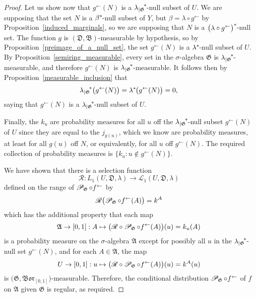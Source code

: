\documentclass[
twoside=true,
paper=letter,
fontsize=11pt,
pagesize=auto,
leqno,
openany,
headsepline,
overfullrule,
]{scrbook}
\theoremstyle{plain}
\theoremstyle{plain}
\theoremstyle{definition}
\theoremstyle{bfnoteitalic}
\theoremstyle{bfnoteroman}
\newcommand{\sigalg}[1]{\mathfrak{#1}}
\newcommand{\cali}[1]{\mathscr{#1}}
\newcommand{\condprobop}[1]{\mathop{\cali{P}\hspace{-1pt}}\nolimits_{#1}}
\newcommand{\borel}{\mathfrak{Bor}}
\newcommand{\textsigma}{\hbox{\large{$\sigma$}}\kern-1pt}
\newcommand{\restrictedto}[1]{_{\lvert#1}\kern-1.5pt}
\newcommand{\preimage}[1]{#1^{\leftarrow}}
\newcommand{\sigmaalgebra}{\sigalg{A}}
\newcommand{\sigmaalgebraii}{\sigalg{B}}
\newcommand{\kernast}{\ast\kern-1pt}
\newcommand{\funcf}{f}
\newcommand{\funcg}{g}
\newcommand{\funck}{k}
\newcommand{\funcj}{j}
\newcommand{\function}{f}
\newcommand{\measurespaceii}{Y}
\newcommand{\measlambda}{\lambda}
\newcommand{\seti}{A}
\newcommand{\regular}{\cali{R}}
\newcommand{\uspace}{U}%
\newcommand{\uspaceelt}{u}
\newcommand{\uspacesig}{\sigalg{D}}
\newcommand{\marginaltwo}{\beta}%
\begin{document}
\begin{proof}
Let us show now that  $\preimage{\funcg}(N)$ is a
${\measlambda\restrictedto{\sigalg{G}}}^\kernast$\hyp{}null subset of $\uspace$.
We are supposing that the set
$N$ is a
$\marginaltwo^\kernast$\hyp{}null subset of $\measurespaceii$,
but
$\marginaltwo = \measlambda \circ \preimage{\funcg}$ by Proposition~\ref{induced_marginals}, so
we are supposing that $N$ is a
$\bigl(\measlambda\circ\preimage{\funcg}\bigr)^\kernast$\hyp{}null set.
The function
$\funcg$ is $(\uspacesig,\sigmaalgebraii)$\hyp{}measurable by hypothesis,
so by Proposition~\ref{preimage_of_a_null_set}, the set
$\preimage{\funcg}(N)$ is a $\measlambda^\kernast$\hyp{}null subset of $\uspace$.
By Proposition~\ref{semiring_measurable}, every set in the \textsigma\hyp{}algebra $\sigalg{G}$ is
${\measlambda\restrictedto{\sigalg{G}}}^\kernast$\hyp{}measurable, and therefore
$\preimage{\funcg}(N)$ is ${\measlambda\restrictedto{\sigalg{G}}}^\kernast$\hyp{}measurable.
It follows then by Proposition~\ref{measurable_inclusion} that
\[
{\measlambda\restrictedto{\sigalg{G}}}^* \bigl(\preimage{\funcg}(N)\bigr)
=
\lambda^\kernast\bigl(\preimage{\funcg}(N)\bigr)
= 0,
\]
saying that
$\preimage{\funcg}(N)$ is a
${\measlambda\restrictedto{\sigalg{G}}}^\kernast$\hyp{}null subset of $\uspace$.

Finally, the $\funck_\uspaceelt$ are probability measures for all $\uspaceelt$ off the
${\measlambda\restrictedto{\sigalg{G}}}^\kernast$\hyp{}null subset
$\preimage{\funcg}(N)$
of $\uspace$
since they are equal to the
$\funcj_{\funcg(\uspaceelt)}$, which we know are probability measures, at least for all
$\funcg(\uspaceelt)$ off $N$, or equivalently, for all $\uspaceelt$ off
$\preimage{\funcg}(N)$.
The required collection of probability measures is
$\{ \funck_\uspaceelt : \uspaceelt\notin \preimage{\funcg}(N) \}$.

We have shown that there is a selection function
\[
\regular:
L_1(\uspace,\uspacesig,\measlambda)
\to
\cali{L}_1(\uspace,\uspacesig,\measlambda)
\]
defined on the range of
$\condprobop{\sigalg{G}}\circ \preimage{\funcf}$
by
\[
\regular\bigl(
\condprobop{\sigalg{G}}\circ \preimage{\funcf}(\seti)
\bigr)
=
\funck^\seti
\]
which has the additional property that each map
\[
\sigmaalgebra\to [0,1]: \seti \mapsto
\bigl( \regular\circ\condprobop{\sigalg{G}} \circ\preimage{\function}
(\seti)\bigr)(\uspaceelt)
= \funck_\uspaceelt(\seti)
\]
is a probability measure on the \textsigma\hyp{}algebra $\sigmaalgebra$ except for possibly all
$\uspaceelt$ in the
${\measlambda\restrictedto{\sigalg{G}}}^\kernast$-null set
$\preimage{\funcg}(N)$,
and for each
$\seti\in\sigmaalgebra$, the map
\[
\uspace\to [0,1] : \uspaceelt\mapsto
\bigl( \regular\circ\condprobop{\sigalg{G}}\circ\preimage{\function}
(\seti)\bigr)(\uspaceelt)
= \funck^\seti(\uspaceelt)
\]
is $\bigl(\sigalg{G}, \borel_{[0,1]}\bigr)$\hyp{}measurable.
Therefore, the conditional distribution
$\condprobop{\sigalg{G}}\circ \preimage{\funcf}$ of $\funcf$ on
$\sigmaalgebra$ given $\sigalg{G}$ is regular, as required.
\end{proof}
\end{document}
